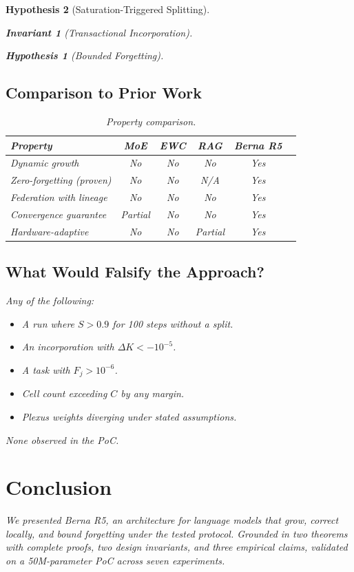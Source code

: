 \documentclass[11pt,a4paper]{article}
\newtheorem{invariant}{Invariant}
\newtheorem{hypothesis}{Hypothesis}
\begin{document}
\begin{hypothesis}[Saturation-Triggered Splitting]
\begin{invariant}[Transactional Incorporation]
\begin{hypothesis}[Bounded Forgetting]
\subsection{Comparison to Prior Work}

\begin{table}[h]
\centering
\caption{Property comparison.}
\label{tab:compare}
\begin{tabular}{lccccc}
\hline
Property & MoE & EWC & RAG & Berna R5 \\
\hline
Dynamic growth & No & No & No & Yes \\
Zero-forgetting (proven) & No & No & N/A & Yes \\
Federation with lineage & No & No & No & Yes \\
Convergence guarantee & Partial & No & No & Yes \\
Hardware-adaptive & No & No & Partial & Yes \\
\hline
\end{tabular}
\end{table}

\subsection{What Would Falsify the Approach?}

Any of the following:
\begin{itemize}
    \item A run where $S > 0.9$ for 100 steps without a split.
    \item An incorporation with $\Delta K < -10^{-5}$.
    \item A task with $F_j > 10^{-6}$.
    \item Cell count exceeding $C$ by any margin.
    \item Plexus weights diverging under stated assumptions.
\end{itemize}

None observed in the PoC.

\section{Conclusion}
\label{sec:concl}

We presented Berna R5, an architecture for language models
that grow, correct locally, and bound forgetting under the tested protocol. Grounded in
two theorems with complete proofs, two design invariants, and three empirical claims, validated on a
50M-parameter PoC across seven experiments.


\end{hypothesis}
\end{invariant}
\end{hypothesis}
\end{document}
